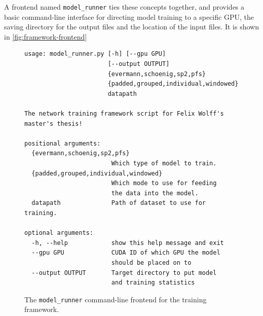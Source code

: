 A frontend named \verb=model_runner= ties these concepts together, and provides a basic command-line interface for directing model training to a specific GPU, the saving directory for the output files and the location of the input files. It is shown in \autoref{fig:framework-frontend}
\begin{figure}
\centering
\begin{verbatim}
usage: model_runner.py [-h] [--gpu GPU]
                       [--output OUTPUT]
                       {evermann,schoenig,sp2,pfs}
                       {padded,grouped,individual,windowed}
                       datapath

The network training framework script for Felix Wolff's master's thesis!

positional arguments:
  {evermann,schoenig,sp2,pfs}
                        Which type of model to train.
  {padded,grouped,individual,windowed}
                        Which mode to use for feeding
                        the data into the model.
  datapath              Path of dataset to use for training.

optional arguments:
  -h, --help            show this help message and exit
  --gpu GPU             CUDA ID of which GPU the model
                        should be placed on to
  --output OUTPUT       Target directory to put model
                        and training statistics
\end{verbatim}
\caption{The \verb=model_runner= command-line frontend for the training framework.}
\label{fig:framework-frontend}
\end{figure}